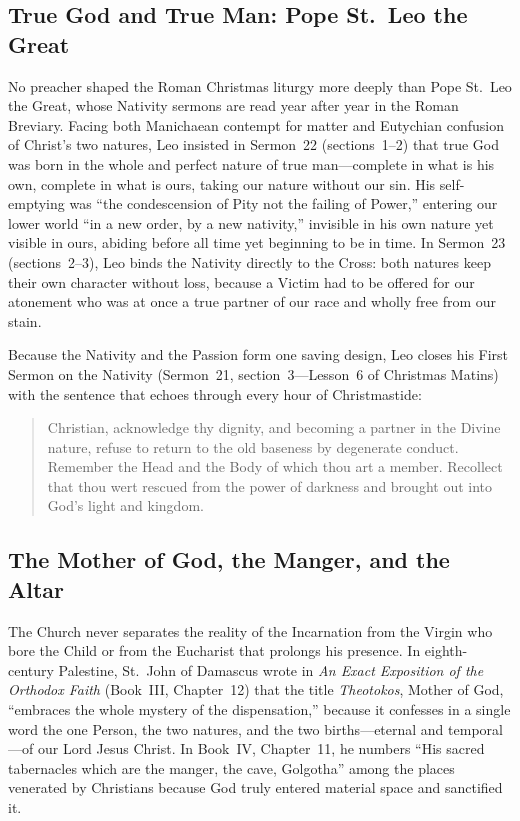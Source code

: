 \subsection{True God and True Man: Pope St.~Leo the Great}

No preacher shaped the Roman Christmas liturgy more deeply than Pope St.~Leo the
Great, whose Nativity sermons are read year after year in the Roman Breviary.
Facing both Manichaean contempt for matter and Eutychian confusion of Christ's
two natures, Leo insisted in Sermon~22 (sections~1--2) that true God was born in
the whole and perfect nature of true man---complete in what is his own, complete
in what is ours, taking our nature without our sin. His self-emptying was ``the
condescension of Pity not the failing of Power,'' entering our lower world ``in
a new order, by a new nativity,'' invisible in his own nature yet visible in
ours, abiding before all time yet beginning to be in time. In Sermon~23
(sections~2--3), Leo binds the Nativity directly to the Cross: both natures keep
their own character without loss, because a Victim had to be offered for our
atonement who was at once a true partner of our race and wholly free from our
stain.

Because the Nativity and the Passion form one saving design, Leo closes his
First Sermon on the Nativity (Sermon~21, section~3---Lesson~6 of Christmas
Matins) with the sentence that echoes through every hour of Christmastide:

\begin{quote}
Christian, acknowledge thy dignity, and becoming a partner in the Divine nature,
refuse to return to the old baseness by degenerate conduct. Remember the Head
and the Body of which thou art a member. Recollect that thou wert rescued from
the power of darkness and brought out into God's light and kingdom.
\end{quote}

\subsection{The Mother of God, the Manger, and the Altar}

The Church never separates the reality of the Incarnation from the Virgin who
bore the Child or from the Eucharist that prolongs his presence. In
eighth-century Palestine, St.~John of Damascus wrote in \textit{An Exact
Exposition of the Orthodox Faith} (Book~III, Chapter~12) that the title
\textit{Theotokos}, Mother of God, ``embraces the whole mystery of the
dispensation,'' because it confesses in a single word the one Person, the two
natures, and the two births---eternal and temporal---of our Lord Jesus Christ.
In Book~IV, Chapter~11, he numbers ``His sacred tabernacles which are the
manger, the cave, Golgotha'' among the places venerated by Christians because
God truly entered material space and sanctified it.

